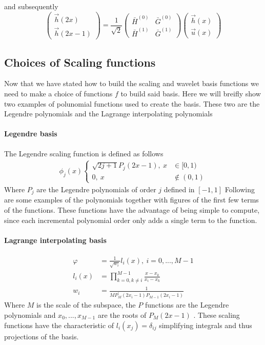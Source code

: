 \documentclass[../master_thesis.tex]{subfiles}
\begin{document}
and subsequently
\begin{equation}
  \begin{pmatrix}
    \vec{h}(2x) \\
    \vec{h}(2x-1)
  \end{pmatrix}
  = \frac{1}{\sqrt{2}}
  \begin{pmatrix}
    \bar{H}^{(0)} & \bar{G}^{(0)} \\
    \bar{H}^{(1)} & \bar{G}^{(1)}
  \end{pmatrix}
  \begin{pmatrix}
    \vec{h}(x) \\
    \vec{u}(x)
  \end{pmatrix}
\end{equation}

\subsection{Choices of Scaling functions }
Now that we have stated how to build the scaling and wavelet basis functions
we need to make a choice of functions $f$ to build said basis.
Here we will breifly show two examples of polunomial functions used to create the
basis. These two are the Legendre polynomials and the Lagrange interpolating
polynomials \cite{Beylkin:MRA, Beylkin1999AdaptiveSO}
\paragraph{Legendre basis}
The Legendre scaling function is defined as follows
\begin{align}
  \phi_j(x)
  \begin{cases}
    \sqrt{2j+1} P_j(2x-1), \ x&\in [0,1)\\
    0,\ x&\notin (0, 1)
  \end{cases}
\end{align}
Where $P_j$ are the Legendre polynomials of order $j$ defined in $[-1, 1]$ \cite{Beylkin:MRA}
Following are some examples of the polynomials together with figures of the first few terms
of the functions. These functions have the advantage of being simple to compute,
since each incremental polynomial order only adds a single term to the function.

\paragraph{Lagrange interpolating basis}
  \begin{align}
    \varphi &= \frac{1}{\sqrt{w_i}}l_i(x), \ i = 0, ..., M-1\\
    l_i(x) &= \prod^{M-1}_{k = 0, k\neq i} \frac{x-x_k}{x_i-x_k} \\
    w_i &= \frac{1}{MP^\prime_M(2x_i-1)P_{M-1}(2x_i-1)}
  \end{align}
Where $M$ is the scale of the subspace, the $P$ functions are the Legendre polynomials and
$x_0, ..., x_{M-1}$ are the roots of $P_M(2x-1)$ \cite{Beylkin:MRA}.
These scaling functions have the characteristic of $l_i(x_j)=\delta_{ij}$ simplifying
integrals and thus projections of the basis.
\end{document}

